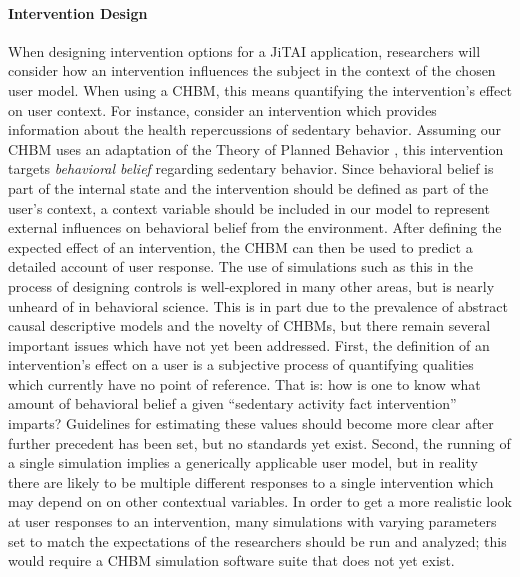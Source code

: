 \documentclass[runningheads,a4paper]{llncs}
\begin{document}
\paragraph{Intervention Design}
When designing intervention options for a JiTAI application, researchers will consider how an intervention influences the subject in the context of the chosen user model.
When using a CHBM, this means quantifying the intervention's effect on user context.
For instance, consider an intervention which provides information about the health repercussions of sedentary behavior.
Assuming our CHBM uses an adaptation of the Theory of Planned Behavior \cite{Ajzen1991theory}, this intervention targets \emph{behavioral belief} regarding sedentary behavior.
Since behavioral belief is part of the internal state and the intervention should be defined as part of the user's context, a context variable should be included in our model to represent external influences on behavioral belief from the environment.
After defining the expected effect of an intervention, the CHBM can then be used to predict a detailed account of user response.
The use of simulations such as this in the process of designing controls is well-explored in many other areas, but is nearly unheard of in behavioral science.
This is in part due to the prevalence of abstract causal descriptive models and the novelty of CHBMs, but there remain several important issues which have not yet been addressed.
First, the definition of an intervention's effect on a user is a subjective process of quantifying qualities which currently have no point of reference.
That is: how is one to know what amount of behavioral belief a given ``sedentary activity fact intervention'' imparts?
Guidelines for estimating these values should become more clear after further precedent has been set, but no standards yet exist.
Second, the running of a single simulation implies a generically applicable user model, but in reality there are likely to be multiple different responses to a single intervention which may depend on on other contextual variables. 
In order to get a more realistic look at user responses to an intervention, many simulations with varying parameters set to match the expectations of the researchers should be run and analyzed; this would require a CHBM simulation software suite that does not yet exist.
\end{document}
